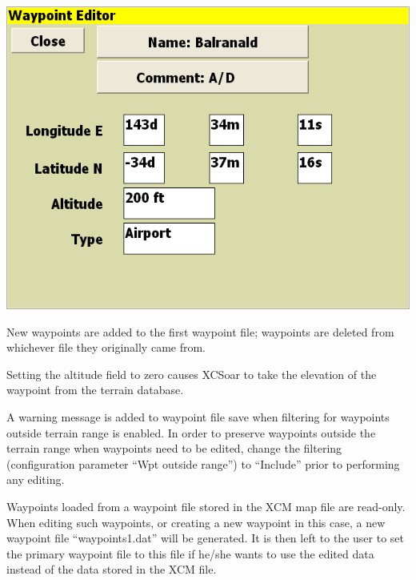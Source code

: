 \documentclass[a4paper,12pt]{refrep}
\begin{document}
\begin{center}
\includegraphics[angle=0,width=\linewidth,keepaspectratio='true']{figures/wayedit-2.png}
\end{center}

New waypoints are added to the first waypoint file; waypoints are
deleted from whichever file they originally came from.

Setting the altitude field to zero causes XCSoar to take the elevation
of the waypoint from the terrain database.

A warning message is added to waypoint file save when filtering for
waypoints outside terrain range is enabled.  In order to preserve
waypoints outside the terrain range when waypoints need to be edited,
change the filtering (configuration parameter ``Wpt outside range'')
to ``Include'' prior to performing any editing.

Waypoints loaded from a waypoint file stored in the XCM map file are
read-only.  When editing such waypoints, or creating a new waypoint in
this case, a new waypoint file ``waypoints1.dat'' will be generated.
It is then left to the user to set the primary waypoint file to this
file if he/she wants to use the edited data instead of the data stored
in the XCM file.



\end{document}
